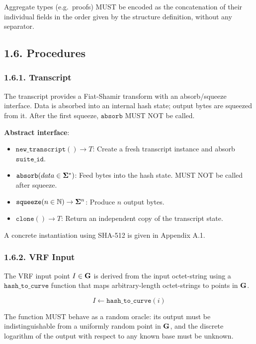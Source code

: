 \documentclass[
]{article}
\providecommand{\tightlist}{%
  \setlength{\itemsep}{0pt}\setlength{\parskip}{0pt}}
\begin{document}
Aggregate types (e.g.~proofs) MUST be encoded as the concatenation of
their individual fields in the order given by the structure definition,
without any separator.

\subsection{1.6. Procedures}\label{procedures}

\subsubsection{1.6.1. Transcript}\label{transcript}

The transcript provides a Fiat-Shamir transform with an absorb/squeeze
interface. Data is absorbed into an internal hash state; output bytes
are squeezed from it. After the first squeeze, \(\texttt{absorb}\) MUST
NOT be called.

\textbf{Abstract interface}:

\begin{itemize}
\tightlist
\item
  \(\texttt{new\_transcript}() \to T\): Create a fresh transcript
  instance and absorb \(\texttt{suite\_id}\).
\item
  \(\texttt{absorb}(data \in \bold{\Sigma}^*)\): Feed bytes into the
  hash state. MUST NOT be called after squeeze.
\item
  \(\texttt{squeeze}(n \in \mathbb{N}) \to \bold{\Sigma}^n\): Produce
  \(n\) output bytes.
\item
  \(\texttt{clone}() \to T\): Return an independent copy of the
  transcript state.
\end{itemize}

A concrete instantiation using SHA-512 is given in Appendix A.1.

\subsubsection{1.6.2. VRF Input}\label{vrf-input}

The VRF input point \(I \in \bold{G}\) is derived from the input
octet-string using a \(\texttt{hash\_to\_curve}\) function that maps
arbitrary-length octet-strings to points in \(\bold{G}\).

\[I \gets \texttt{hash\_to\_curve}(i)\]

The function MUST behave as a random oracle: its output must be
indistinguishable from a uniformly random point in \(\bold{G}\), and the
discrete logarithm of the output with respect to any known base must be
unknown.
\end{document}
